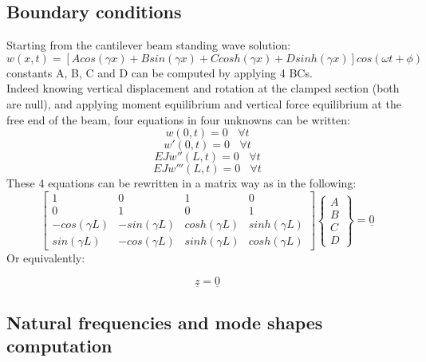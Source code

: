 \documentclass[20pt]{report}
\begin{document}
\subsection{Boundary conditions}
Starting from the cantilever beam standing wave solution:
\begin{equation*}
    w(x,t)=\left[A cos(\gamma x) + B sin(\gamma x) + C cosh(\gamma x) + D sinh(\gamma x)\right] cos(\omega t + \phi )
\end{equation*}
constants A, B, C and D can be computed by applying 4 BCs.\\
Indeed knowing vertical displacement and rotation at the clamped section (both are null), and applying moment equilibrium and vertical force equilibrium at the free end of the beam, four equations in four unknowns can be written:
\begin{equation}
    w(0,t)=0 \ \ \ \ \forall t
\end{equation}
\begin{equation}
     w'(0,t)=0 \ \ \ \ \forall t
\end{equation}
\begin{equation}
     E J w''(L,t)=0 \ \ \ \ \forall t 
\end{equation}
\begin{equation}
     E J w'''(L,t)=0 \ \ \ \ \forall t
\end{equation}
These 4 equations can be rewritten in a matrix way as in the following:
\begin{equation*}
    \begin{bmatrix}
    1 & 0 & 1 & 0 \\
    0 & 1 & 0 & 1 \\
    -cos(\gamma L) & -sin(\gamma L) & cosh(\gamma L) & sinh(\gamma L) \\
    sin(\gamma L) & -cos(\gamma L) & sinh(\gamma L) & cosh(\gamma L)
    \end{bmatrix}
    \begin{Bmatrix}
    A \\ B \\ C \\ D
    \end{Bmatrix}
    = \underline 0
\end{equation*}
Or equivalently:

\begin{equation*}
[H(\omega )]\underline z = \underline 0
\end{equation*}

\subsection{Natural frequencies and mode shapes computation}
\end{document}
